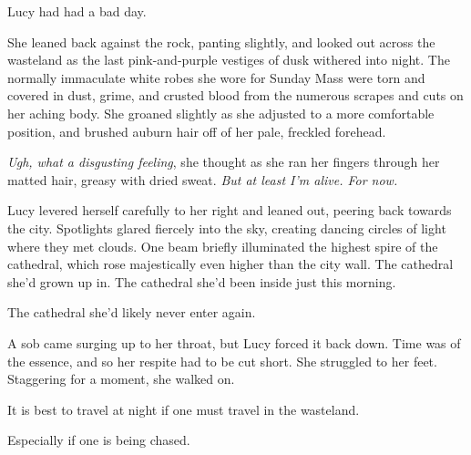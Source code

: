Lucy had had a bad day.

She leaned back against the rock, panting slightly, and looked out across the
wasteland as the last pink-and-purple vestiges of dusk withered into night.
The normally immaculate white robes she wore for Sunday Mass were torn and
covered in dust, grime, and crusted blood from the numerous scrapes and cuts on
her aching body.  She groaned slightly as she adjusted to a more comfortable
position, and brushed auburn hair off of her pale, freckled forehead.

\textit{Ugh, what a disgusting feeling}, she thought as she ran her fingers
through her matted hair, greasy with dried sweat.  \textit{But at least I'm
alive.  For now.}

Lucy levered herself carefully to her right and leaned out, peering back
towards the city.  Spotlights glared fiercely into the sky, creating dancing
circles of light where they met clouds.  One beam briefly illuminated the
highest spire of the cathedral, which rose majestically even higher than the
city wall.  The cathedral she'd grown up in.  The cathedral she'd been inside
just this morning.

The cathedral she'd likely never enter again.

A sob came surging up to her throat, but Lucy forced it back down.  Time was of
the essence, and so her respite had to be cut short.  She struggled to her
feet.  Staggering for a moment, she walked on.

It is best to travel at night if one must travel in the wasteland.

Especially if one is being chased.
